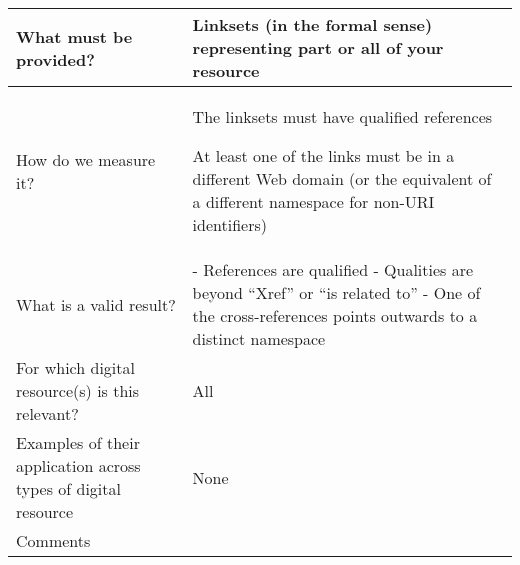 \documentclass[english]{article}
\begin{document}
\begin{longtable}{|p{5cm}|p{9cm}|}
  
\\



\hline
What must be provided? &  


Linksets (in the formal sense) representing part or all of your resource



\\



\hline
How do we measure it? &  


The linksets must have qualified references

At least one of the links must be in a different Web domain (or the equivalent of a different namespace for non-URI identifiers)



\\



\hline
What is a valid result? &  


- References are qualified\newline
- Qualities are beyond “Xref” or “is related to”\newline
- One of the cross-references points outwards to a distinct namespace\newline


\\



\hline
For which digital resource(s) is this relevant? &  All\\



\hline
Examples of their application across types of digital resource &  None

\\



\hline

Comments & 


\\
\hline

\end{longtable}


\newpage
\end{document}
